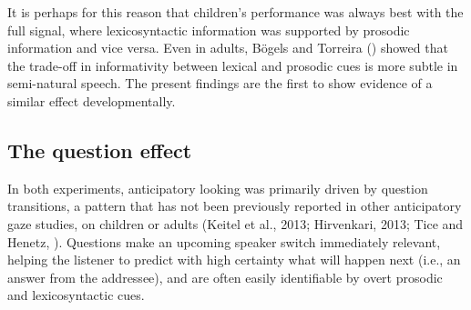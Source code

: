 \documentclass[authoryear, 12pt]{elsarticle}
\begin{document}
It is perhaps for this reason that children's performance was always best with the full signal, where lexicosyntactic information was supported by prosodic information and vice versa. Even in adults, B\"{o}gels and Torreira (\citeyear{bogelstorreira2015}) showed that the trade-off in informativity between lexical and prosodic cues is more subtle in semi-natural speech. The present findings are the first to show evidence of a similar effect developmentally.


\subsection*{The question effect}

In both experiments, anticipatory looking was primarily driven by question transitions, a pattern that has not been previously reported in other anticipatory gaze studies, on children or adults (Keitel et al., 2013; Hirvenkari, 2013; Tice and Henetz, \citeyear{TiceHenetz11}). Questions make an upcoming speaker switch immediately relevant, helping the listener to predict with high certainty what will happen next (i.e., an answer from the addressee), and are often easily identifiable by overt prosodic and lexicosyntactic cues.
\end{document}

